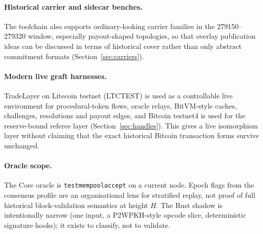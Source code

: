 \documentclass[11pt]{article}
\begin{document}
\paragraph{Historical carrier and sidecar benches.}
The toolchain also supports ordinary-looking carrier families in the
279150--279320 window, especially payout-shaped topologies, so that overlay
publication ideas can be discussed in terms of historical cover rather than only
abstract commitment formats (Section~\ref{sec:carriers}).

\paragraph{Modern live graft harnesses.}
TradeLayer on Litecoin testnet (LTCTEST) is used as a controllable live
environment for procedural-token flows, oracle relays, BitVM-style caches,
challenges, resolutions and payout edges, and Bitcoin testnet4 is used for the
reserve-bound referee layer (Section~\ref{sec:handles}). This gives a live
isomorphism layer without claiming that the exact historical Bitcoin transaction
forms survive unchanged.

\paragraph{Oracle scope.} The Core oracle is \texttt{testmempoolaccept} on a
current node. Epoch flags from the consensus profile are an organisational lens
for stratified replay, not proof of full historical block-validation semantics
at height $H$. The Rust shadow is intentionally narrow (one input, a P2WPKH-style
opcode slice, deterministic signature hooks); it exists to classify, not to
validate.
\end{document}
